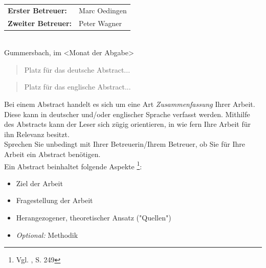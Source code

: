 \documentclass[a4paper,12pt,oneside]{article}
\begin{document}
\begin{titlepage}
\begin{center}
      \vspace{1.5cm}
      \begin{tabular}{ll} %
          \textbf{Erster Betreuer:} & Marc Oedingen \\
          \textbf{Zweiter Betreuer:} & Peter Wagner \\
      \end{tabular}
      \vspace{1.5cm}
      \\Gummersbach, im <Monat der Abgabe>
    \end{center}    
  \end{titlepage}
  
  \newpage
  
  \begin{abstract}
    Platz für das deutsche Abstract...
  \end{abstract}
  
  \renewcommand{\abstractname}{Abstract}
  \begin{abstract}
    Platz für das englische Abstract...
  \end{abstract}
    \vspace{1cm}
  \begin{tcolorbox}[title={Das Abstract}]
Bei einem Abstract handelt es sich um eine Art \textit{Zusammenfassung} Ihrer Arbeit. Diese kann in deutscher und/oder englischer Sprache verfasst werden. Mithilfe des Abstracts kann der Leser sich zügig orientieren, in wie fern Ihre Arbeit für ihn Relevanz besitzt.\\                                                                      Sprechen Sie unbedingt mit Ihrer Betreuerin/Ihrem Betreuer, ob Sie für Ihre Arbeit ein Abstract benötigen.\\
Ein Abstract beinhaltet folgende Aspekte \footnote{ Vgl. \cite{SW11}, S. 249}:
\begin{itemize}
 \item Ziel der Arbeit
 \item Fragestellung der Arbeit
  \item Herangezogener, theoretischer Ansatz ("Quellen")
  \item \textit{Optional:} Methodik
\end{itemize}
  \end{tcolorbox}
\end{document}
